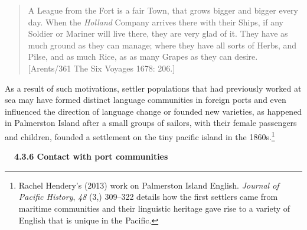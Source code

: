 \begin{quotation}
A League from the Fort is a fair Town, that grows bigger and bigger every day. When the \textit{Holland} Company arrives there with their Ships, if any Soldier or Mariner will live there, they are very glad of it. They have as much ground as they can manage; where they have all sorts of Herbs, and Pilse, and as much Rice, as as many Grapes as they can desire. [Arents/361 The Six Voyages 1678: 206.]

\end{quotation}
\begin{styleStandard}
As a result of such motivations, settler populations that had previously worked at sea may have formed distinct language communities in foreign ports and even influenced the direction of language change or founded new varieties, as happened in Palmerston Island after a small groups of sailors, with their female passengers and children, founded a settlement on the tiny pacific island in the 1860s.\footnote{ Rachel Hendery’s (2013) work on Palmerston Island English. \textit{Journal of Pacific History}, \textit{48} (3,) 309–322 details how the first settlers came from maritime communities and their linguistic heritage gave rise to a variety of English that is unique in the Pacific. }
\end{styleStandard}


\begin{styleStandard}
\textbf{\ \ 4.3.6 Contact with port communities}
\end{styleStandard}



